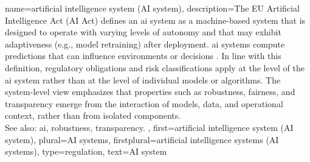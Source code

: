 



{name={artificial intelligence system (AI system)},
	description={The EU Artificial Intelligence Act 
		(AI Act) \cite{AIact} defines  
		an \gls{ai} system as a machine-based system that is designed 
		to operate with varying levels of autonomy and that may 
		exhibit adaptiveness (e.g., \gls{model} retraining) 
		after deployment. \Gls{ai} systems compute \glspl{prediction} that can 
              	influence environments or decisions \cite{EUAIAct2024}. In line with 
              	this definition, regulatory obligations and risk classifications apply 
              	at the level of the \gls{ai} system rather than at the level of individual 
              	\glspl{model} or \glspl{algorithm}.  
		The system-level view emphasizes that properties such as \gls{robustness}, 
		fairness, and \gls{transparency} emerge from the interaction of 
		\glspl{model}, \gls{data}, and operational context, rather than from 
		isolated components. 
		\\
		See also: \gls{ai}, \gls{robustness}, \gls{transparency}. },
 	first={artificial intelligence system (AI system)},
 	plural={AI systems},
 	firstplural={artificial intelligence systems (AI systems)},
 	type=regulation,
 	text={AI system}
}

